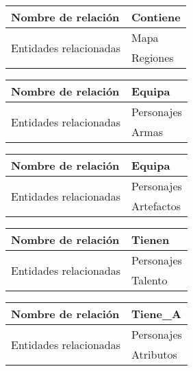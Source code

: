 \documentclass{report}
\begin{document}
\hfill

\begin{center}    
    \begin{tabular}{|p{3cm}|p{5cm}|}
    \hline
    Nombre de relación& Contiene\\ 
    \hline
    \hline
    \multirow{2}{6em}{Entidades relacionadas}& Mapa \\ &Regiones\\ 
    \hline
    \end{tabular}
\end{center}

\hfill

\begin{center}    
    \begin{tabular}{|p{3cm}|p{5cm}|}
    \hline
    Nombre de relación& Equipa\\ 
    \hline
    \hline
    \multirow{2}{6em}{Entidades relacionadas}& Personajes \\ &Armas\\ 
    \hline
    \end{tabular}
\end{center}

\hfill

\begin{center}    
    \begin{tabular}{|p{3cm}|p{5cm}|}
    \hline
    Nombre de relación& Equipa\\ 
    \hline
    \hline
    \multirow{2}{6em}{Entidades relacionadas}& Personajes \\ &Artefactos\\ 
    \hline
    \end{tabular}
\end{center}

\hfill

\begin{center}    
    \begin{tabular}{|p{3cm}|p{5cm}|}
    \hline
    Nombre de relación& Tienen\\ 
    \hline
    \hline
    \multirow{2}{6em}{Entidades relacionadas}& Personajes \\ &Talento\\ 
    \hline
    \end{tabular}
\end{center}

\hfill

\begin{center}    
    \begin{tabular}{|p{3cm}|p{5cm}|}
    \hline
    Nombre de relación& Tiene\_A\\ 
    \hline
    \hline
    \multirow{2}{6em}{Entidades relacionadas}& Personajes \\ &Atributos\\ 
    \hline
    \end{tabular}
\end{center}
\end{document}
